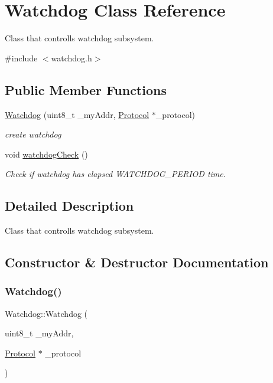 \hypertarget{classWatchdog}{}\section{Watchdog Class Reference}
\label{classWatchdog}


Class that controlls watchdog subsystem.  




{\ttfamily \#include $<$watchdog.\+h$>$}

\subsection*{Public Member Functions}
\begin{DoxyCompactItemize}
\item 
\hyperlink{classWatchdog_aacb47be7c4ebce2a2f90952de806092b}{Watchdog} (uint8\+\_\+t \+\_\+my\+Addr, \hyperlink{classProtocol}{Protocol} $\ast$\+\_\+protocol)
\begin{DoxyCompactList}\small\item\em create watchdog \end{DoxyCompactList}\item 
void \hyperlink{classWatchdog_a37f012036421572ddef5ad3a8272c389}{watchdog\+Check} ()
\begin{DoxyCompactList}\small\item\em Check if watchdog has elapsed W\+A\+T\+C\+H\+D\+O\+G\+\_\+\+P\+E\+R\+I\+OD time. \end{DoxyCompactList}\end{DoxyCompactItemize}


\subsection{Detailed Description}
Class that controlls watchdog subsystem. 

\subsection{Constructor \& Destructor Documentation}
\mbox{\label{classWatchdog_aacb47be7c4ebce2a2f90952de806092b}} 
\subsubsection{\texorpdfstring{Watchdog()}{Watchdog()}}
{\footnotesize\ttfamily Watchdog\+::\+Watchdog (\begin{DoxyParamCaption}\item[{uint8\+\_\+t}]{\+\_\+my\+Addr,  }\item[{\hyperlink{classProtocol}{Protocol} $\ast$}]{\+\_\+protocol }\end{DoxyParamCaption})\hspace{0.3cm}{\ttfamily [inline]}}



